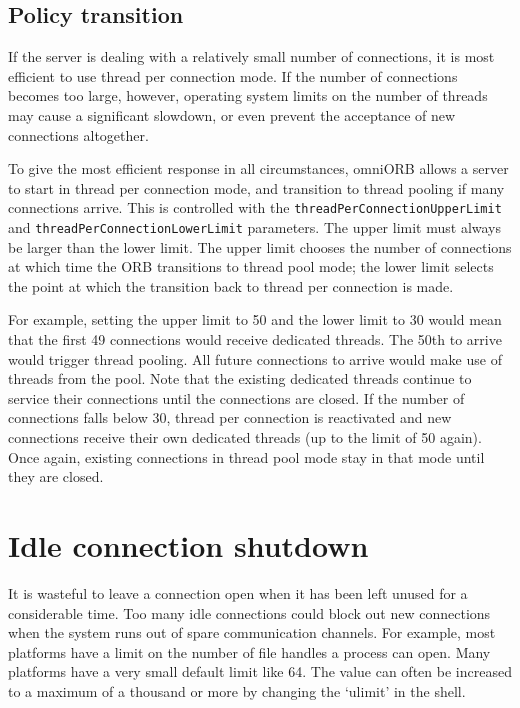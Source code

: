 \documentclass[11pt,oneside,a4paper]{book}
\newcommand{\code}[1]{\texttt{#1}}
\newcommand{\dsc}{\discretionary{}{}{}}
\begin{document}
\subsection{Policy transition}

If the server is dealing with a relatively small number of
connections, it is most efficient to use thread per connection mode.
If the number of connections becomes too large, however, operating
system limits on the number of threads may cause a significant
slowdown, or even prevent the acceptance of new connections
altogether.

To give the most efficient response in all circumstances, omniORB
allows a server to start in thread per connection mode, and transition
to thread pooling if many connections arrive. This is controlled with
the \code{threadPerConnection\dsc{}UpperLimit} and
\code{threadPerConnectionLowerLimit} parameters. The upper limit must
always be larger than the lower limit. The upper limit chooses the
number of connections at which time the ORB transitions to thread pool
mode; the lower limit selects the point at which the transition back
to thread per connection is made.

For example, setting the upper limit to 50 and the lower limit to 30
would mean that the first 49 connections would receive dedicated
threads. The 50th to arrive would trigger thread pooling. All future
connections to arrive would make use of threads from the pool. Note
that the existing dedicated threads continue to service their
connections until the connections are closed. If the number of
connections falls below 30, thread per connection is reactivated and
new connections receive their own dedicated threads (up to the limit
of 50 again). Once again, existing connections in thread pool mode
stay in that mode until they are closed.


\section{Idle connection shutdown}
\label{sec:connShutdown}

It is wasteful to leave a connection open when it has been left unused
for a considerable time. Too many idle connections could block out new
connections when the system runs out of spare communication channels.
For example, most platforms have a limit on the number of file handles
a process can open. Many platforms have a very small default limit
like 64. The value can often be increased to a maximum of a thousand
or more by changing the `ulimit' in the shell.
\end{document}
